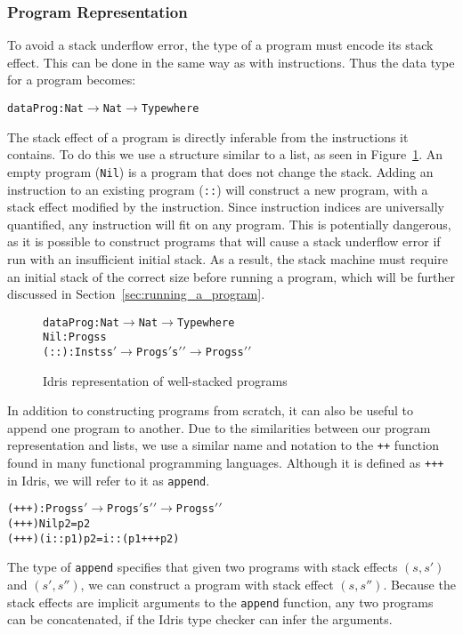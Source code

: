 \subsubsection{Program Representation}
To avoid a stack underflow error, the type of a program must encode its stack effect. This can be done in the same way as with instructions. Thus the data type for a program becomes:
\begin{alltt}
data Prog : Nat \(\rightarrow\) Nat \(\rightarrow\) Type where
\end{alltt}
The stack effect of a program is directly inferable from the instructions it contains. To do this we use a structure similar to a list, as seen in Figure~\ref{fig:idris_impl_of_prg}. An empty program (\texttt{Nil}) is a program that does not change the stack. Adding an instruction to an existing program (\texttt{::}) will construct a new program, with a stack effect modified by the instruction. Since instruction indices are universally quantified, any instruction will fit on any program. This is potentially dangerous, as it is possible to construct programs that will cause a stack underflow error if run with an insufficient initial stack. As a result, the stack machine must require an initial stack of the correct size before running a program, which will be further discussed in Section~\ref{sec:running_a_program}.

\begin{figure}
\begin{alltt}
data Prog : Nat \(\rightarrow\) Nat \(\rightarrow\) Type where
  Nil  : Prog s s
  (::) : Inst s s\('\) \(\rightarrow\) Prog s\('\) s\('\)\('\) \(\rightarrow\) Prog s s\('\)\('\)
\end{alltt}
\caption{Idris representation of well-stacked programs}
\label{fig:idris_impl_of_prg}
\end{figure}

In addition to constructing programs from scratch, it can also be useful to append one program to another. Due to the similarities between our program representation and lists, we use a similar name and notation to the \texttt{++} function found in many functional programming languages. Although it is defined as \texttt{+++} in Idris, we will refer to it as \texttt{append}.

\begin{alltt}
(+++) : Prog s s\('\) \(\rightarrow\) Prog s\('\) s\('\)\('\) \(\rightarrow\) Prog s s\('\)\('\)
(+++) Nil p2       = p2
(+++) (i :: p1) p2 = i :: (p1 +++ p2)
\end{alltt}

The type of \texttt{append} specifies that given two programs with stack effects $(s, s')$ and $(s', s'')$, we can construct a program with stack effect $(s, s'')$. Because the stack effects are implicit arguments to the \texttt{append} function, any two programs can be concatenated, if the Idris type checker can infer the arguments.

